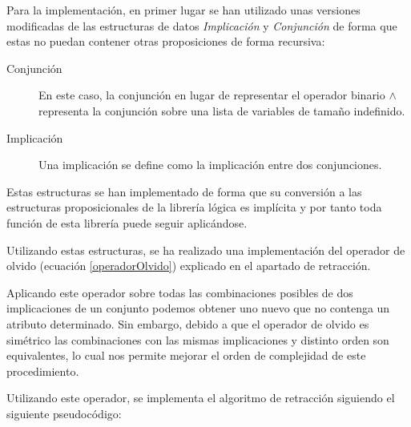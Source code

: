	Para la implementación, en primer lugar se han utilizado unas versiones modificadas de las estructuras de datos \textit{Implicación} y \textit{Conjunción} de forma que estas no puedan contener otras proposiciones de forma recursiva:
	
	\begin{description}
		\item[Conjunción] En este caso, la conjunción en lugar de representar el operador binario $\wedge$ representa la conjunción sobre una lista de variables de tamaño indefinido.
		\item[Implicación] Una implicación se define como la implicación entre dos conjunciones.
	\end{description}

	Estas estructuras se han implementado de forma que su conversión a las estructuras proposicionales de la librería lógica es implícita y por tanto toda función de esta librería puede seguir aplicándose.
	
	Utilizando estas estructuras, se ha realizado una implementación del operador de olvido (ecuación \ref{operadorOlvido}) explicado en el apartado de retracción.
	
	Aplicando este operador sobre todas las combinaciones posibles de dos implicaciones de un conjunto podemos obtener uno nuevo que no contenga un atributo determinado. Sin embargo, debido a que el operador de olvido es simétrico las combinaciones con las mismas implicaciones y distinto orden son equivalentes, lo cual nos permite mejorar el orden de complejidad de este procedimiento.
	
	Utilizando este operador, se implementa el algoritmo de retracción siguiendo el siguiente pseudocódigo: 
	
	{
		\centering
		\noindent{}	

	}

